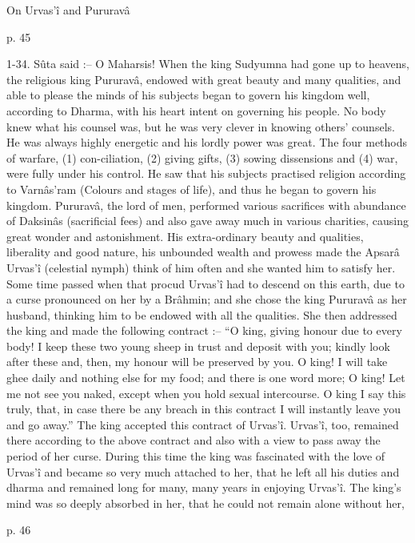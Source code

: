 On Urvas’î and Pururavâ

 

p. 45

 

1-34. Sûta said :-- O Maharsis! When the king Sudyumna had gone up to heavens, the religious king Pururavâ, endowed with great beauty and many qualities, and able to please the minds of his subjects began to govern his kingdom well, according to Dharma, with his heart intent on governing his people. No body knew what his counsel was, but he was very clever in knowing others' counsels. He was always highly energetic and his lordly power was great. The four methods of warfare, (1) con-ciliation, (2) giving gifts, (3) sowing dissensions and (4) war, were fully under his control. He saw that his subjects practised religion according to Varnâs'ram (Colours and stages of life), and thus he began to govern his kingdom. Pururavâ, the lord of men, performed various sacrifices with abundance of Daksinâs (sacrificial fees) and also gave away much in various charities, causing great wonder and astonishment. His extra-ordinary beauty and qualities, liberality and good nature, his unbounded wealth and prowess made the Apsarâ Urvas’î (celestial nymph) think of him often and she wanted him to satisfy her. Some time passed when that procud Urvas'î had to descend on this earth, due to a curse pronounced on her by a Brâhmin; and she chose the king Pururavâ as her husband, thinking him to be endowed with all the qualities. She then addressed the king and made the following contract :-- “O king, giving honour due to every body! I keep these two young sheep in trust and deposit with you; kindly look after these and, then, my honour will be preserved by you. O king! I will take ghee daily and nothing else for my food; and there is one word more; O king! Let me not see you naked, except when you hold sexual intercourse. O king I say this truly, that, in case there be any breach in this contract I will instantly leave you and go away.” The king accepted this contract of Urvas’î. Urvas’î, too, remained there according to the above contract and also with a view to pass away the period of her curse. During this time the king was fascinated with the love of Urvas’î and became so very much attached to her, that he left all his duties and dharma and remained long for many, many years in enjoying Urvas’î. The king's mind was so deeply absorbed in her, that he could not remain alone without her,

 

p. 46

